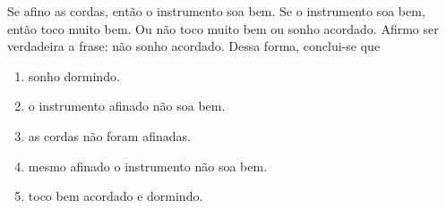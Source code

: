 \item 
		Se afino as cordas, então o instrumento soa bem. Se o instrumento soa bem, então toco muito bem. Ou não toco muito bem ou sonho acordado. Afirmo ser verdadeira a frase: não sonho acordado. Dessa forma, conclui-se que
		\begin{enumerate}
				\item  sonho dormindo.
				\item  o instrumento afinado não soa bem.
				\item  as cordas não foram afinadas.
				\item  mesmo afinado o instrumento não soa bem.
				\item  toco bem acordado e dormindo.
		\end{enumerate}
